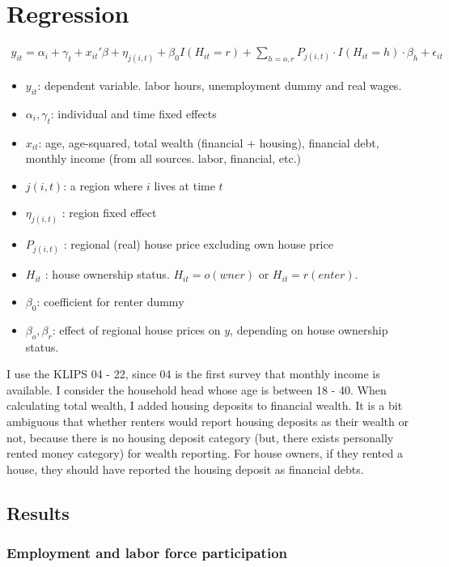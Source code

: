 \documentclass[12pt,letterpaper]{article}
\begin{document}
\section{Regression}
\begin{eqnarray}
y_{it} = \alpha_i + \gamma_t + x_{it}'\beta + \eta_{j(i,t)} +\beta_0 I(H_{it} = r) + \sum_{h=o,r} P_{j(i,t)}\cdot I(H_{it} = h)\cdot\beta_{h} + \epsilon_{it}
\end{eqnarray}
\begin{itemize}
	\item $y_{it}$: dependent variable. labor hours, unemployment dummy and real wages.
	\item $\alpha_i,\gamma_t$: individual and time fixed effects			\item $x_{it}$: age, age-squared, total wealth (financial + housing), financial debt, monthly income (from all sources. labor, financial, etc.)
	\item $j(i,t)$: a region where $i$ lives at time $t$
	\item $\eta_{j(i,t)}$ : region fixed effect
	\item $P_{j(i,t)}$ : regional (real) house price excluding own house price
	\item $H_{it}$ : house ownership status. $H_{it} = o(wner)$ or $H_{it}=r(enter)$.
	\item $\beta_0$: coefficient for renter dummy
	\item $\beta_o,\beta_r$: effect of regional house prices on $y$, depending on house ownership status.
\end{itemize}
I use the KLIPS 04 - 22, since 04 is the first survey that monthly income is available. I consider the household head whose age is between 18 - 40. When calculating total wealth, I added housing deposits to financial wealth. It is a bit ambiguous that whether renters would report housing deposits as their wealth or not, because there is no housing deposit category (but, there exists personally rented money category) for wealth reporting. For house owners, if they rented a house, they should have reported the housing deposit as financial debts.
\newpage
\subsection{Results}
\subsubsection{Employment and labor force participation}


\end{document}
